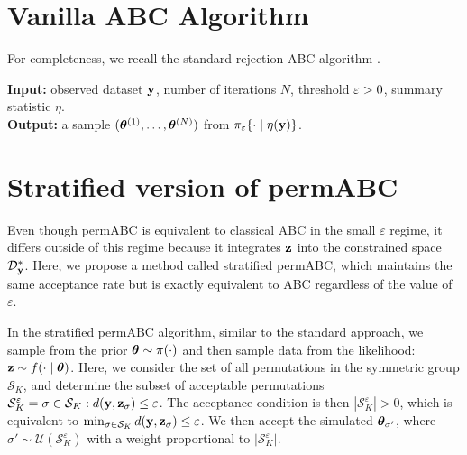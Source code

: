 \section{Vanilla ABC Algorithm}
\label{appendix_vanilla_abc}

For completeness, we recall the standard rejection ABC algorithm \citep{marinApproximateBayesianComputational2012a}.

\begin{algorithm}
\label{alg:abc_vanilla}
\caption{Vanilla Approximate Bayesian Computation}
\textbf{Input: }observed dataset $\mathbf{y}$, number of iterations $N$, threshold $\varepsilon>0$, summary statistic $\eta$.\\
\textbf{Output: }a sample $(\boldsymbol{\theta}^{(1)}, \dots, \boldsymbol{\theta}^{(N)})$ from $\pi_\varepsilon\{\cdot\mid\eta(\mathbf{y})\}$.\\

\BlankLine

\end{algorithm}

\section{Stratified version of permABC}
\label{sec:appendix_strat}

Even though permABC is equivalent to classical ABC in the small $\varepsilon$ regime, it differs outside of this regime because it integrates $\mathbf{z}$ into the constrained space $\mathcal{D}_{\mathbf{y}}^*$. Here, we propose a method called stratified permABC, which maintains the same acceptance rate but is exactly equivalent to ABC regardless of the value of $\varepsilon$.

In the stratified permABC algorithm, similar to the standard approach, we sample from the prior $\boldsymbol{\theta} \sim \pi(\cdot)$ and then sample data from the likelihood: $\mathbf{z} \sim f(\cdot \mid \boldsymbol{\theta})$. Here, we consider the set of all permutations in the symmetric group $\mathcal{S}_K$, and determine the subset of acceptable permutations $\mathcal S_K^\varepsilon = { \sigma \in \mathcal S_K : d(\mathbf{y},\mathbf{z}_{\sigma}) \leq \varepsilon }$. The acceptance condition is then $\left | \mathcal S_K^\varepsilon \right | > 0$, which is equivalent to $\min_{\sigma \in \mathcal S_K} d(\mathbf{y},\mathbf{z}_{\sigma}) \leq \varepsilon$. We then accept the simulated $\boldsymbol{\theta}_{\sigma'}$, where $\sigma' \sim \mathcal U(\mathcal S_K^\varepsilon)$ with a weight proportional to $\lvert \mathcal S_K^\varepsilon \rvert$.

